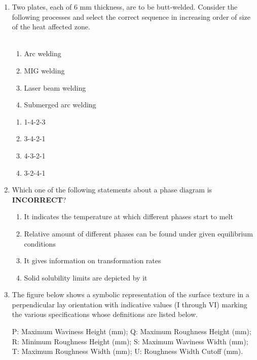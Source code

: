 \documentclass[12pt,onecolumn]{article}
\begin{document}
\begin{enumerate}
    \item Two plates, each of 6 mm thickness, are to be butt-welded. Consider the following processes and select the correct sequence in increasing order of size of the heat affected zone.\\\\
          \begin{enumerate}[label=\arabic*.]
              \item Arc welding
              \item MIG welding
              \item Laser beam welding
              \item Submerged arc welding
          \end{enumerate}
          \begin{enumerate}
              \item 1-4-2-3
              \item 3-4-2-1
              \item 4-3-2-1
              \item 3-2-4-1
          \end{enumerate}
    \item Which one of the following statements about a phase diagram is \textbf{INCORRECT}?
          \begin{enumerate}
              \item It indicates the temperature at which different phases start to melt
              \item Relative amount of different phases can be found under given equilibrium conditions
              \item It gives information on transformation rates
              \item Solid solubility limits are depicted by it
          \end{enumerate}

    \item The figure below shows a symbolic representation of the surface texture in a perpendicular lay orientation with indicative values (I through VI) marking the various specifications whose definitions are listed below.

          P: Maximum Waviness Height (mm); Q: Maximum Roughness Height (mm);\\
          R: Minimum Roughness Height (mm); S: Maximum Waviness Width (mm);\\
          T: Maximum Roughness Width (mm); U: Roughness Width Cutoff (mm).


\end{enumerate}
\end{document}
